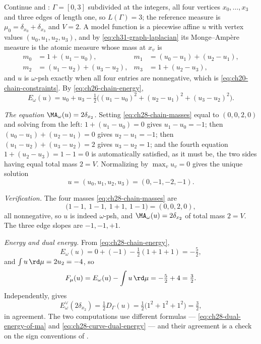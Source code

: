 \begin{example}[{The chain $\Gamma=[0,3]$: a solved equation, verified}]
\label{ex:ch28-chain-dual-energy}
Continue  and :
$\Gamma=[0,3]$ subdivided at the integers, all four vertices
$x_0,\ldots,x_3$ and three edges of length one, so $L(\Gamma)=3$; the
reference measure is $\mu_0=\delta_{x_0}+\delta_{x_3}$ and $V=2$.  A
model function is a piecewise affine $u$ with vertex values
$(u_0,u_1,u_2,u_3)$, and by \eqref{eq:ch31-graph-laplacian} its
Monge--Amp\`ere measure is the atomic measure whose mass at $x_v$ is
\begin{equation}
\label{eq:ch28-chain-masses}
 \begin{aligned}
 m_0&=1+(u_1-u_0),
 &m_1&=(u_0-u_1)+(u_2-u_1),\\
 m_2&=(u_1-u_2)+(u_3-u_2),
 &m_3&=1+(u_2-u_3),
 \end{aligned}
\end{equation}
and $u$ is $\omega$-psh exactly when all four entries are nonnegative,
which is \eqref{eq:ch20-chain-constraints}.  By
\eqref{eq:ch26-chain-energy},
\begin{equation}
\label{eq:ch28-chain-energy}
 E_\omega(u)=u_0+u_3
   -\tfrac12\bigl((u_1-u_0)^2+(u_2-u_1)^2+(u_3-u_2)^2\bigr).
\end{equation}

\emph{The equation $\MA_\omega(u)=2\delta_{x_2}$.}  Setting
\eqref{eq:ch28-chain-masses} equal to $(0,0,2,0)$ and solving from the
left: $1+(u_1-u_0)=0$ gives $u_1-u_0=-1$; then
$(u_0-u_1)+(u_2-u_1)=0$ gives $u_2-u_1=-1$; then
$(u_1-u_2)+(u_3-u_2)=2$ gives $u_3-u_2=1$; and the fourth equation
$1+(u_2-u_3)=1-1=0$ is automatically satisfied, as it must be, the two
sides having equal total mass $2=V$.  Normalizing by
$\max_vu_v=0$ gives the unique solution
\begin{equation}
\label{eq:ch28-chain-solution}
 u=(u_0,u_1,u_2,u_3)=(0,-1,-2,-1).
\end{equation}

\emph{Verification.}  The four masses \eqref{eq:ch28-chain-masses} are
\[
 \bigl(1-1,\ 1-1,\ 1+1,\ 1-1\bigr)=(0,0,2,0),
\]
all nonnegative, so $u$ is indeed $\omega$-psh, and
$\MA_\omega(u)=2\delta_{x_2}$ of total mass $2=V$.  The three edge
slopes are $-1,-1,+1$.

\emph{Energy and dual energy.}  From \eqref{eq:ch28-chain-energy},
\[
 E_\omega(u)=0+(-1)-\tfrac12(1+1+1)=-\tfrac52 ,
\]
and $\int u\,\rd\mu=2u_2=-4$, so
\[
 F_\mu(u)=E_\omega(u)-\int u\,\rd\mu=-\tfrac52+4=\tfrac32 .
\]
Independently,  gives
\[
 E^\vee_\omega(2\delta_{x_2})=\tfrac12D_\Gamma(u)
 =\tfrac12\bigl(1^2+1^2+1^2\bigr)=\tfrac32 ,
\]
in agreement.  The two computations use different formulas ---
\eqref{eq:ch28-dual-energy-of-ma} and
\eqref{eq:ch28-curve-dual-energy} --- and their agreement is a check on the
sign conventions of .


\end{example}
